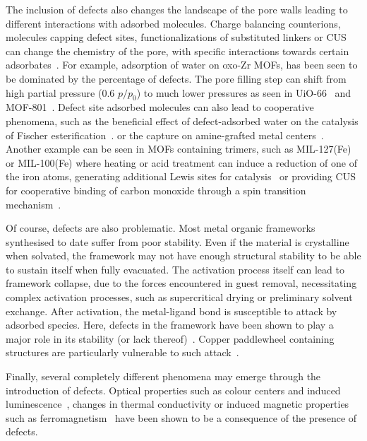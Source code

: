 The inclusion of defects also changes the landscape of the pore
walls leading to different interactions with adsorbed molecules.
Charge balancing counterions, molecules capping defect sites,
functionalizations of substituted linkers or CUS can change the
chemistry of the pore, with specific interactions towards certain
adsorbates~\cite{dissegnaUsingWaterAdsorption2017}.
For example, adsorption of water on oxo-Zr MOFs, has been seen to
be dominated by the percentage of defects. The pore filling step can
shift from high partial pressure (0.6 \(p/p_0\)) to much lower pressures
as seen in UiO-66~\cite{ghoshWaterAdsorptionUiO662014} and
MOF-801~\cite{choiRoleStructuralDefects2018}. Defect site adsorbed
molecules can also lead to cooperative phenomena,
such as the beneficial effect of defect-adsorbed water on the
catalysis of Fischer esterification~\cite{caratelliNatureActiveSites2017}.
or the  capture on amine-grafted metal 
centers~\cite{mcdonaldCooperativeInsertionCO22015}.
Another example can be seen in MOFs containing  trimers,
such as MIL-127(Fe) or MIL-100(Fe) where heating or acid treatment
can induce a reduction of one of the iron atoms, generating
additional Lewis sites for catalysis~\cite{yoonControlledReducibilityMetalOrganic2010}
or providing CUS for cooperative binding of carbon monoxide through
a spin transition mechanism~\cite{reedSpinTransitionMechanism2017}.

Of course, defects are also problematic. Most metal organic frameworks
synthesised to date suffer from poor stability. Even if the material
is crystalline when solvated, the framework may not have
enough structural stability to be able to sustain itself when fully
evacuated. The activation process itself can lead to framework
collapse, due to the forces encountered in guest removal, necessitating
complex activation processes, such as supercritical drying or
preliminary solvent exchange. After activation, the metal-ligand bond
is susceptible to attack by adsorbed species. Here, defects in the framework
have been shown to play a major role in its stability (or lack
thereof)~\cite{burtchWaterStabilityAdsorption2014}.
Copper paddlewheel containing structures are particularly vulnerable to
such attack~\cite{alvarezStructureStabilityHKUST12017}.

Finally, several completely different phenomena may emerge through
the introduction of defects. Optical properties such as colour
centers and induced luminescence~\cite{mullerDefectsColorCenters2017},
changes in thermal conductivity or induced magnetic properties
such as ferromagnetism~\cite{shenOriginLongRangeFerromagnetic2012}
have been shown to be a consequence of the presence of defects.

